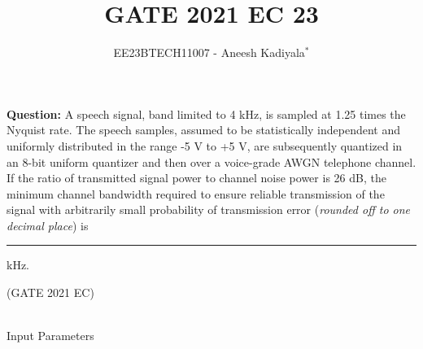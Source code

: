 \documentclass[journal,12pt,twocolumn]{IEEEtran}
\theoremstyle{remark}
\begin{document}

\vspace{3cm}

\title{GATE 2021 EC 23}
\author{EE23BTECH11007 - Aneesh Kadiyala$^{*}$%
}
\maketitle
\newpage
\bigskip

\renewcommand{\thefigure}{\theenumi}
\renewcommand{\thetable}{\theenumi}

\vspace{3cm}
\textbf{Question:} A speech signal, band limited to 4 kHz, is sampled at 1.25 times the Nyquist rate. The speech samples, assumed to be statistically independent and uniformly distributed in the range -5 V to +5 V, are subsequently quantized in an 8-bit uniform quantizer and then over a voice-grade AWGN telephone channel. If the ratio of transmitted signal power to channel noise power is 26 dB, the minimum channel bandwidth required to ensure reliable transmission of the signal with arbitrarily small probability of transmission error (\textit{rounded off to one decimal place}) is \rule{1cm}{0.15mm} kHz.

\hfill(GATE 2021 EC)
\\
\solution
\\
\fi
\begin{table}[h!]
    \centering
    
    \caption{Input Parameters}
    \label{tab:2021ec23_1}
\end{table}
\end{document}
